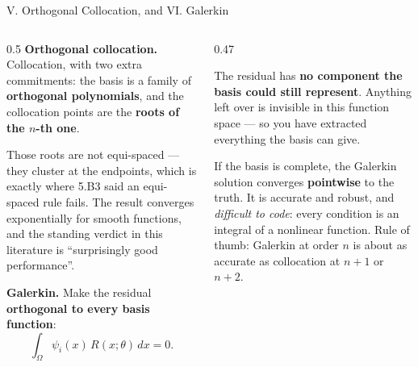 \begin{frame}{V. Orthogonal Collocation, and VI. Galerkin}
\begin{columns}[T]
\begin{column}{0.5\textwidth}
\small
\textbf{Orthogonal collocation.} Collocation, with two extra commitments: the basis is a family of \textbf{orthogonal polynomials}, and the collocation points are the \textbf{roots of the $n$-th one}.
\medskip

Those roots are not equi-spaced --- they cluster at the endpoints, which is exactly where 5.B3 said an equi-spaced rule fails. The result converges exponentially for smooth functions, and the standing verdict in this literature is ``surprisingly good performance''.
\medskip

\textbf{Galerkin.} Make the residual \textbf{orthogonal to every basis function}:
\[
  \int_{\Omega}\psi_i(x)\,R(x;\theta)\,dx=0 .
\]
\end{column}
\begin{column}{0.47\textwidth}
\begin{conceptbox}[title=\textbf{What Galerkin means}]\small
The residual has \textbf{no component the basis could still represent}. Anything left over is invisible in this function space --- so you have extracted everything the basis can give.
\end{conceptbox}
\medskip
\begin{takeawaybox}\footnotesize
If the basis is complete, the Galerkin solution converges \textbf{pointwise} to the truth. It is accurate and robust, and \emph{difficult to code}: every condition is an integral of a nonlinear function.
\medskip
Rule of thumb: Galerkin at order $n$ is about as accurate as collocation at $n+1$ or $n+2$.
\end{takeawaybox}
\end{column}
\end{columns}
\vspace{1mm}
\end{frame}

